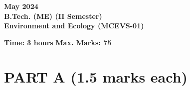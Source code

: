 \documentclass[12pt,a4paper]{article}
\begin{document}
\pagecolor{pagecolor}

\begin{center}
    \textbf{May 2024} \\
    \textbf{B.Tech. (ME) (II Semester)} \\
    \textbf{Environment and Ecology (MCEVS-01)}
\end{center}

\vspace{1em}

\noindent \textbf{Time: 3 hours} \hfill \textbf{Max. Marks: 75}

\vspace{1em}

\section*{\textbf{PART A (1.5 marks each)}}
\end{document}
